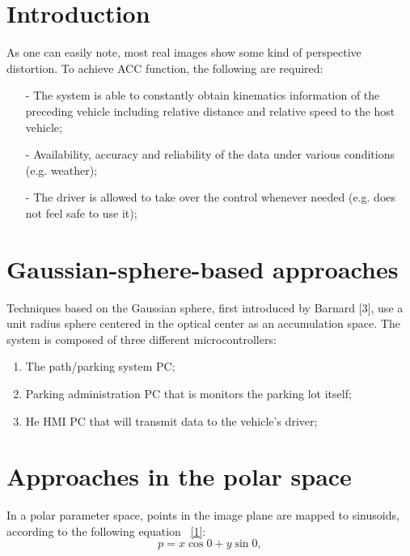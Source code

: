 \documentclass[12pt]{article}
\begin{document}
\section {Introduction}

\raggedright As one can easily note, most real images show some kind of perspective distortion. To achieve ACC function, the following are required:
\newline
\begin{itemize}
    \item[-] The system is able to constantly obtain kinematics information of the preceding vehicle including relative distance and relative speed to the host vehicle;
    \item[-] Availability, accuracy and reliability of the data under various conditions (e.g. weather);
    \item[-] The driver is allowed to take over the control whenever needed (e.g. does not feel safe to use it);
\end{itemize}
\hspace{5mm}
\section {Gaussian-sphere-based approaches}

\raggedright Techniques based on the Gaussian sphere, first introduced by Barnard [3], use a unit radius sphere centered in the optical center as an accumulation space. The system is composed of three different microcontrollers:
\noindent
\begin{enumerate}
\item The path/parking system PC;
\item Parking administration PC that is monitors the parking lot itself;
\item He HMI PC that will transmit data to the vehicle's driver;
\end{enumerate}

\hspace{5mm}
\section {Approaches in the polar space}

\raggedright In a polar parameter space, points in the image plane are mapped to sinusoids, according to the following equation ~\eqref{1}:
\noindent
\begin{equation}\label{1}
p=x\cos⁡0+y\sin⁡0,
\end{equation}
\end{document}
